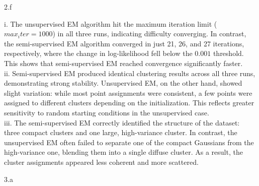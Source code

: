 \documentclass{article}
\newenvironment{answer}{\sf \begingroup\color{ForestGreen}}{\endgroup}%
\begin{document}
\LARGE
2.f
\normalsize

  \begin{answer}
    i. The unsupervised EM algorithm hit the maximum iteration limit ($max_iter = 1000$) in all three runs, indicating difficulty converging. In contrast, the semi-supervised EM algorithm converged in just 21, 26, and 27 iterations, respectively, where the change in log-likelihood fell below the $0.001$ threshold. This shows that semi-supervised EM reached convergence significantly faster. \\
    ii. Semi-supervised EM produced identical clustering results across all three runs, demonstrating strong stability. Unsupervised EM, on the other hand, showed slight variation: while most point assignments were consistent, a few points were assigned to different clusters depending on the initialization. This reflects greater sensitivity to random starting conditions in the unsupervised case. \\
    iii. The semi-supervised EM correctly identified the structure of the dataset: three compact clusters and one large, high-variance cluster. In contrast, the unsupervised EM often failed to separate one of the compact Gaussians from the high-variance one, blending them into a single diffuse cluster. As a result, the cluster assignments appeared less coherent and more scattered.
  \end{answer}
\clearpage

\LARGE
3.a
\normalsize
\end{document}

